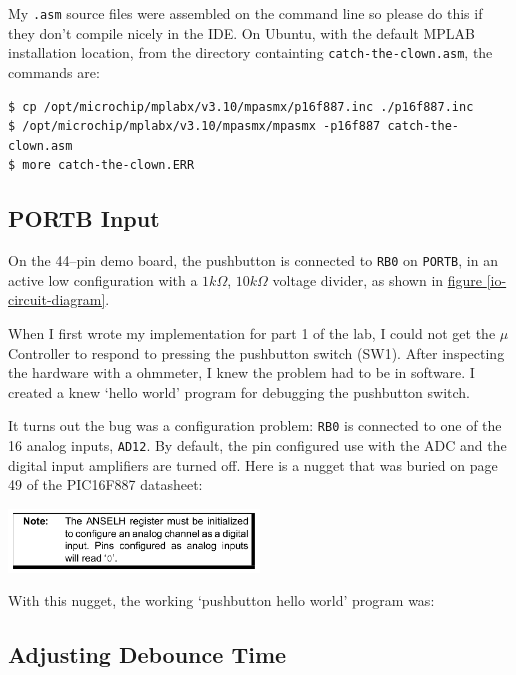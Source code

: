 \documentclass[11pt]{article}
\begin{document}
My \texttt{.asm} source files were assembled on the command line so
please do this if they don't compile nicely in the IDE.
On Ubuntu, with the default MPLAB installation location, 
from the directory containting \texttt{catch-the-clown.asm}, the commands are:
\begin{verbatim}
$ cp /opt/microchip/mplabx/v3.10/mpasmx/p16f887.inc ./p16f887.inc
$ /opt/microchip/mplabx/v3.10/mpasmx/mpasmx -p16f887 catch-the-clown.asm
$ more catch-the-clown.ERR
\end{verbatim}

\subsection{PORTB Input}

On the 44--pin demo board, the pushbutton is connected to \texttt{RB0}
on \texttt{PORTB}, in an active low configuration with a $1k\Omega$, $10k\Omega$
voltage divider, as shown in \hyperref[io-circuit-diagram]{figure \ref{io-circuit-diagram}}.

When I first wrote my implementation for part 1 of the lab,
I could not get the $\mu$Controller to respond to pressing the
pushbutton switch (SW1). After inspecting the hardware with a ohmmeter,
I knew the problem had to be in software. I created a knew `hello world'
program for debugging the pushbutton switch.

It turns out the bug was a configuration problem: \texttt{RB0} is connected
to one of the 16 analog inputs, \texttt{AD12}. By default, the pin configured
use with the ADC and the digital input amplifiers are turned off.
Here is a nugget that was buried on page 49 of the PIC16F887 datasheet:
\begin{center}
	\includegraphics[width=0.5\textwidth]{Figures/port-b-configuration-note.pdf}
\end{center}
With this nugget, the working `pushbutton hello world' program was:


\subsection{Adjusting Debounce Time}
\end{document}
